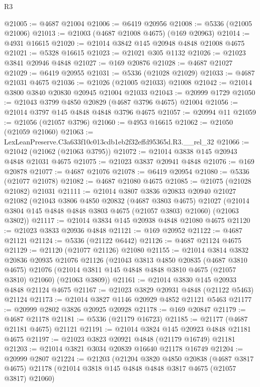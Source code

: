\begin{lexlean}{R3}
\begin{coremodule}
@21005 := @4687 @21004
@21006 := @6419 @20956
@21008 := @5336 (@21005 @21006)
@21013 := @21003 (@4687 @21008 @4675) (@169 @20963)
@21014 := @4931 @16615
@21020 := @21014 @3842 @145 @20948 @4848 @21008 @4675
@21021 := @5328 @16615
@21023 := @21021 @305 @1132
@21026 := @21023 @3841 @20946 @4848
@21027 := @169 @20876
@21028 := @4687 @21027
@21029 := @6419 @20955
@21031 := @5336 (@21028 @21029)
@21033 := @4687 @21031 @4675
@21036 := @21026 (@21005 @21033) @21008
@21042 := @21014 @3800 @3840 @20830 @20945 @21004 @21033
@21043 := @20999 @1729
@21050 := @21043 @3799 @4850 @20829 (@4687 @3796 @4675) @21004
@21056 := @21014 @3797 @145 @4848 @4848 @3796 @4675
@21057 := @20994 @11
@21059 := @21056 (@21057 @3796)
@21060 := @4953 @16615
@21062 := @21050 (@21059 @21060)
@21063 := LexLeanPreserve.C3a633f10c013cdb1eb2f32effd95365d.R3.__rel_32
@21066 := @21042 (@21062 (@21063 @3795))
@21072 := @21014 @3838 @145 @20943 @4848 @21031 @4675
@21075 := @21023 @3837 @20941 @4848
@21076 := @169 @20878
@21077 := @4687 @21076
@21078 := @6419 @20954
@21080 := @5336 (@21077 @21078)
@21082 := @4687 @21080 @4675
@21085 := @21075 (@21028 @21082) @21031
@21111 := @21014
    @3807
    @3836
    @20833
    @20940
    @21027
    @21082
    (@21043
      @3806
      @4850
      @20832
      (@4687 @3803 @4675)
      @21027
      (@21014 @3804 @145 @4848 @4848 @3803 @4675 (@21057 @3803) @21060)
      (@21063 @3802))
@21117 := @21014 @3834 @145 @20938 @4848 @21080 @4675
@21120 := @21023 @3833 @20936 @4848
@21121 := @169 @20952
@21122 := @4687 @21121
@21124 := @5336 (@21122 @6442)
@21126 := @4687 @21124 @4675
@21129 := @21120 (@21077 @21126) @21080
@21155 := @21014
    @3814
    @3832
    @20836
    @20935
    @21076
    @21126
    (@21043
      @3813
      @4850
      @20835
      (@4687 @3810 @4675)
      @21076
      (@21014 @3811 @145 @4848 @4848 @3810 @4675 (@21057 @3810) @21060)
      (@21063 @3809))
@21161 := @21014 @3830 @145 @20933 @4848 @21124 @4675
@21167 := @21023 @3829 @20931 @4848 (@21122 @5463) @21124
@21173 := @21014 @3827 @1146 @20929 @4852 @21121 @5463
@21177 := @20999 @2802 @3826 @20925 @20928
@21178 := @169 @20847
@21179 := @4687 @21178
@21181 := @5336 (@21179 @16723)
@21185 := @21177 (@4687 @21181 @4675) @21121
@21191 := @21014 @3824 @145 @20923 @4848 @21181 @4675
@21197 := @21023 @3823 @20921 @4848 (@21179 @16749) @21181
@21203 := @21014 @3821 @3034 @20839 @16640 @21178 @16749
@21204 := @20999 @2807
@21224 := @21203
    (@21204
      @3820
      @4850
      @20838
      (@4687 @3817 @4675)
      @21178
      (@21014 @3818 @145 @4848 @4848 @3817 @4675 (@21057 @3817) @21060)

\end{coremodule}
\end{lexlean}
